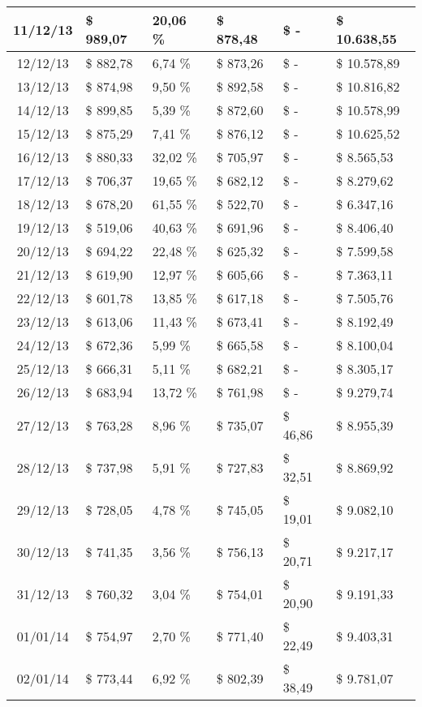 \begin{small}
\begin{longtable}{|c|l|l|l|l|l|}
11/12/13 & \$ 989,07 & 20,06 \% & \$ 878,48 & \$ - & \$ 10.638,55 \\ \hline
12/12/13 & \$ 882,78 & 6,74 \% & \$ 873,26 & \$ - & \$ 10.578,89 \\ \hline
13/12/13 & \$ 874,98 & 9,50 \% & \$ 892,58 & \$ - & \$ 10.816,82 \\ \hline
14/12/13 & \$ 899,85 & 5,39 \% & \$ 872,60 & \$ - & \$ 10.578,99 \\ \hline
15/12/13 & \$ 875,29 & 7,41 \% & \$ 876,12 & \$ - & \$ 10.625,52 \\ \hline
16/12/13 & \$ 880,33 & 32,02 \% & \$ 705,97 & \$ - & \$ 8.565,53 \\ \hline
17/12/13 & \$ 706,37 & 19,65 \% & \$ 682,12 & \$ - & \$ 8.279,62 \\ \hline
18/12/13 & \$ 678,20 & 61,55 \% & \$ 522,70 & \$ - & \$ 6.347,16 \\ \hline
19/12/13 & \$ 519,06 & 40,63 \% & \$ 691,96 & \$ - & \$ 8.406,40 \\ \hline
20/12/13 & \$ 694,22 & 22,48 \% & \$ 625,32 & \$ - & \$ 7.599,58 \\ \hline
21/12/13 & \$ 619,90 & 12,97 \% & \$ 605,66 & \$ - & \$ 7.363,11 \\ \hline
22/12/13 & \$ 601,78 & 13,85 \% & \$ 617,18 & \$ - & \$ 7.505,76 \\ \hline
23/12/13 & \$ 613,06 & 11,43 \% & \$ 673,41 & \$ - & \$ 8.192,49 \\ \hline
24/12/13 & \$ 672,36 & 5,99 \% & \$ 665,58 & \$ - & \$ 8.100,04 \\ \hline
25/12/13 & \$ 666,31 & 5,11 \% & \$ 682,21 & \$ - & \$ 8.305,17 \\ \hline
26/12/13 & \$ 683,94 & 13,72 \% & \$ 761,98 & \$ - & \$ 9.279,74 \\ \hline
27/12/13 & \$ 763,28 & 8,96 \% & \$ 735,07 & \$ 46,86 & \$ 8.955,39 \\ \hline
28/12/13 & \$ 737,98 & 5,91 \% & \$ 727,83 & \$ 32,51 & \$ 8.869,92 \\ \hline
29/12/13 & \$ 728,05 & 4,78 \% & \$ 745,05 & \$ 19,01 & \$ 9.082,10 \\ \hline
30/12/13 & \$ 741,35 & 3,56 \% & \$ 756,13 & \$ 20,71 & \$ 9.217,17 \\ \hline
31/12/13 & \$ 760,32 & 3,04 \% & \$ 754,01 & \$ 20,90 & \$ 9.191,33 \\ \hline
01/01/14 & \$ 754,97 & 2,70 \% & \$ 771,40 & \$ 22,49 & \$ 9.403,31 \\ \hline
02/01/14 & \$ 773,44 & 6,92 \% & \$ 802,39 & \$ 38,49 & \$ 9.781,07 \\ \hline

\end{longtable}
\end{small}
